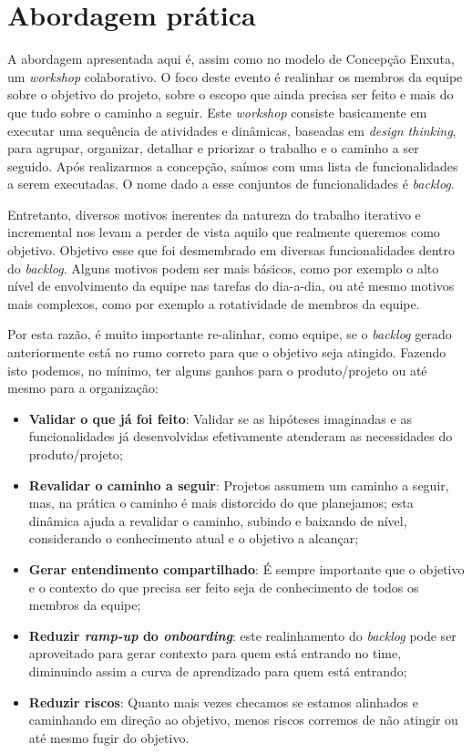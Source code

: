\documentclass[10pt]{article}
\begin{document}
        
    

\section{Abordagem prática}\label{sec:abordagem}

    A abordagem apresentada aqui é, assim como no modelo de Concepção Enxuta, um \textit{workshop} colaborativo. O foco deste evento é realinhar os membros da equipe sobre o objetivo do projeto, sobre o escopo que ainda precisa ser feito e mais do que tudo sobre o caminho a seguir. Este \textit{workshop} consiste basicamente em executar uma sequência de atividades e dinâmicas, baseadas em \textit{design thinking}, para agrupar, organizar, detalhar e priorizar o trabalho e o caminho a ser seguido. Após realizarmos a concepção, saímos com uma lista de funcionalidades a serem executadas. O nome dado a esse conjuntos de funcionalidades é \textit{backlog}.
    
    Entretanto, diversos motivos inerentes da natureza do trabalho iterativo e incremental nos levam a perder de vista aquilo que realmente queremos como objetivo. Objetivo esse que foi desmembrado em diversas funcionalidades dentro do \textit{backlog}. Alguns motivos podem ser mais básicos, como por exemplo o alto nível de envolvimento da equipe nas tarefas do dia-a-dia, ou até mesmo motivos mais complexos, como por exemplo a rotatividade de membros da equipe.
    
    Por esta razão, é muito importante re-alinhar, como equipe, se o \textit{backlog} gerado anteriormente está no rumo correto para que o objetivo seja atingido. Fazendo isto podemos, no mínimo, ter alguns ganhos para o produto/projeto ou até mesmo para a organização:
    \begin{itemize}
        \item \textbf{Validar o que já foi feito}: Validar se as hipóteses imaginadas e as funcionalidades já desenvolvidas efetivamente atenderam as necessidades do produto/projeto;
        \item \textbf{Revalidar o caminho a seguir}: Projetos assumem um caminho a seguir, mas, na prática o caminho é mais distorcido do que planejamos; esta dinâmica ajuda a revalidar o caminho, subindo e baixando de nível, considerando o conhecimento atual e o objetivo a alcançar;
        \item \textbf{Gerar entendimento compartilhado}: É sempre importante que o objetivo e o contexto do que precisa ser feito seja de conhecimento de todos os membros da equipe;
        \item \textbf{Reduzir \textit{ramp-up} do \textit{onboarding}}: este realinhamento do \textit{backlog} pode ser aproveitado para gerar contexto para quem está entrando no time, diminuindo assim a curva de aprendizado para quem está entrando;
        \item \textbf{Reduzir riscos}: Quanto mais vezes checamos se estamos alinhados e caminhando em direção ao objetivo, menos riscos corremos de não atingir ou até mesmo fugir do objetivo.
    \end{itemize}
    
\end{document}
